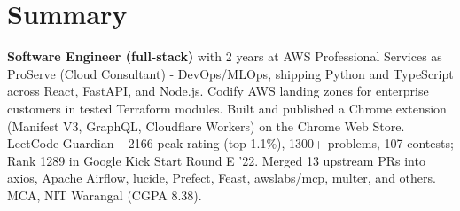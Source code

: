 \section{\textbf{Summary}}
\vspace{1pt}
\small{\textbf{Software Engineer (full-stack)} with 2 years at AWS Professional Services as ProServe (Cloud Consultant) - DevOps/MLOps, shipping Python and TypeScript across React, FastAPI, and Node.js. Codify AWS landing zones for enterprise customers in tested Terraform modules. Built and published a Chrome extension (Manifest V3, GraphQL, Cloudflare Workers) on the Chrome Web Store. LeetCode Guardian -- 2166 peak rating (top 1.1\%), 1300+ problems, 107 contests; Rank 1289 in Google Kick Start Round E '22. Merged 13 upstream PRs into axios, Apache Airflow, lucide, Prefect, Feast, awslabs/mcp, multer, and others. MCA, NIT Warangal (CGPA 8.38).}
\vspace{-2mm}
